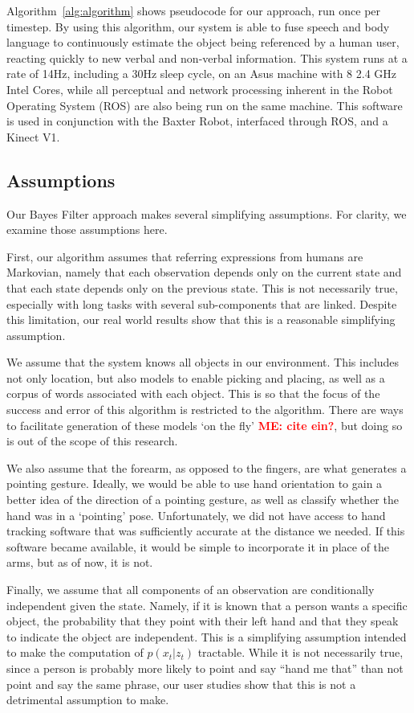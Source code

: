 \documentclass[a4paper, 11pt]{article} %
\newcommand{\menote}[1]{\textcolor{Red}{\textbf{ME: #1}}}
\begin{document}
Algorithm~\ref{alg:algorithm} shows pseudocode for our approach, run once per timestep. 
By using this algorithm, our system is able to fuse speech and body language to continuously estimate the object being referenced by a human user, reacting quickly to new verbal and non-verbal information. This system runs at a rate of 14Hz, including a 30Hz sleep cycle, on an Asus machine with 8 2.4 GHz Intel Cores, while all perceptual and network processing inherent in the Robot Operating System (ROS) are also being run on the same machine. This software is used in conjunction with the Baxter Robot, interfaced through ROS, and a Kinect V1.
\subsection{Assumptions}
Our Bayes Filter approach makes several simplifying assumptions. For clarity, we examine those assumptions here.

First, our algorithm assumes that referring expressions from humans are Markovian, namely that each observation depends only on the current state and that each state depends only on the previous state. This is not necessarily true, especially with long tasks with several sub-components that are linked. Despite this limitation, our real world results show that this is a reasonable simplifying assumption.

We assume that the system knows all objects in our environment. This includes not only location, but also models to enable picking and placing, as well as a corpus of words associated with each object. This is so that the focus of the success and error of this algorithm is restricted to the algorithm. There are ways to facilitate generation of these models `on the fly' \menote{cite ein?}, but doing so is out of the scope of this research.

We also assume that the forearm, as opposed to the fingers, are what generates a pointing gesture. Ideally, we would be able to use hand orientation to gain a better idea of the direction of a pointing gesture, as well as classify whether the hand was in a `pointing' pose. Unfortunately, we did not have access to hand tracking software that was sufficiently accurate at the distance we needed. If this software became available, it would be simple to incorporate it in place of the arms, but as of now, it is not.

Finally, we assume that all components of an observation are conditionally independent given the state. Namely, if it is known that a person wants a specific object, the probability that they point with their left hand and that they speak to indicate the object are independent. This is a simplifying assumption intended to make the computation of $p(x_t | z_t)$ tractable. While it is not necessarily true, since a person is probably more likely to point and say ``hand me that'' than not point and say the same phrase, our user studies show that this is not a detrimental assumption to make.
\end{document}
